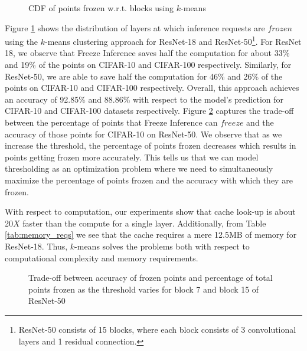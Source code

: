 \documentclass[letterpaper,twocolumn,10pt]{article}
\begin{document}
\begin{figure}
\centering
     \label{fig:upper_bound}
     \label{fig:knn_res18}
\caption{\label{fig:kmeans}
\footnotesize
CDF of points frozen w.r.t. blocks using $k$-means
}   
\end{figure}
Figure \ref{fig:kmeans} shows the distribution of layers at which inference requests are $frozen$ using the $k$-means clustering approach for ResNet-18 and ResNet-50\footnote{ResNet-50 consists of 15 blocks, where each block consists of 3 convolutional layers and 1 residual connection.}. For ResNet 18, we observe that Freeze Inference saves half the computation for about 33\% and 19\% of the points on CIFAR-10 and CIFAR-100 respectively. Similarly, for ResNet-50, we are able to save half the computation for 46\% and 26\% of the points on CIFAR-10 and CIFAR-100 respectively. Overall, this approach achieves an accuracy of 92.85\% and 88.86\% with respect to the model's prediction for CIFAR-10 and CIFAR-100 datasets respectively. Figure \ref{fig:tradeoff} captures the trade-off between the percentage of points that Freeze Inference can $freeze$ and the accuracy of those points for CIFAR-10 on ResNet-50. We observe that as we increase the threshold, the percentage of points frozen decreases which results in points getting frozen more accurately. This tells us that we can model thresholding as an optimization problem where we need to simultaneously maximize the percentage of points frozen and the accuracy with which they are frozen.

With respect to computation, our experiments show that cache look-up is about 20$X$ faster than the compute for a single layer. Additionally, from Table \ref{tab:memory_reqs} we see that the cache requires a mere 12.5MB of memory for ResNet-18. Thus, $k$-means solves the problems both with respect to computational complexity and memory requirements.

\begin{figure}
\centering
\vspace{-10pt}
\caption{\label{fig:tradeoff}
\footnotesize
Trade-off between accuracy of frozen points and percentage of total points frozen as the threshold varies
for block 7 and block 15 of ResNet-50}
\end{figure}
\end{document}
